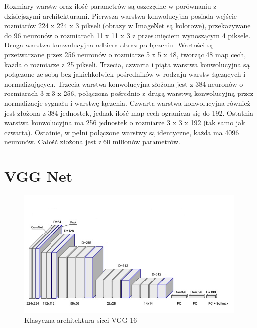 \documentclass[12pt,a4paper,twoside,titlepage,openright]{book}
\begin{document}
Rozmiary warstw oraz ilość parametrów są oszczędne w porównaniu z dzisiejszymi architekturami. Pierwsza warstwa konwolucyjna posiada wejście rozmiarów 224 x 224 x 3 pikseli (obrazy w ImageNet są kolorowe), przekazywane do 96 neuronów o rozmiarach 11 x 11 x 3 z przesunięciem wynoszącym 4 piksele. Druga warstwa konwolucyjna odbiera obraz po łączeniu. Wartości są przetwarzane przez 256 neuronów o rozmiarze 5 x 5 x 48, tworząc 48 map cech, każda o rozmiarze z 25 pikseli. Trzecia, czwarta i piąta warstwa konwolucyjna są połączone ze sobą bez jakichkolwiek pośredników w rodzaju warstw łączących i normalizujących. Trzecia warstwa konwolucyjna złożona jest z 384 neuronów o rozmiarach 3 x 3 x 256, połączona pośrednio z drugą warstwą konwolucyjną przez normalizacje sygnału i warstwę łączenia. Czwarta warstwa konwolucyjna również jest złożona z 384 jednostek, jednak ilość map cech ogranicza się do 192. Ostatnia warstwa konwolucyjna ma 256 jednostek o rozmiarze 3 x 3 x 192 (tak samo jak czwarta). Ostatnie, w pełni połączone warstwy są identyczne, każda ma 4096 neuronów. Całość złożona jest z 60 milionów parametrów. \cite{NIPS2012_4824}

\section{VGG Net}
\begin{figure}[ht]
	\centering
			\includegraphics[resolution=100, scale=0.8]{VGGarchitecture.png}
		\caption{Klasyczna architektura sieci VGG-16}
\end{figure}
\end{document}
